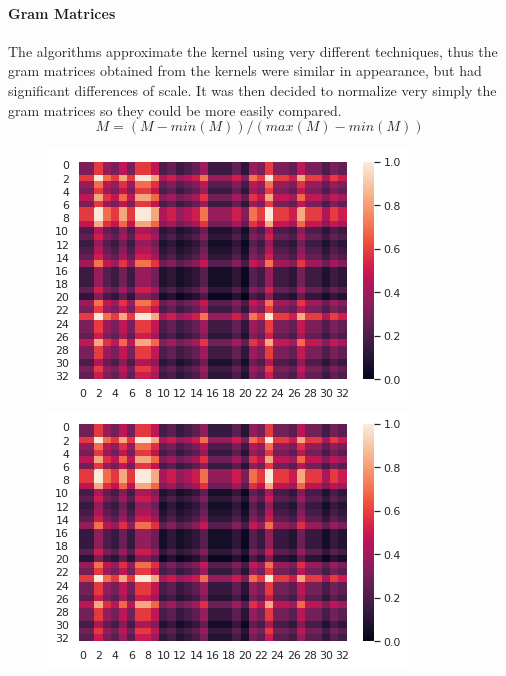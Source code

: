 \documentclass{article}
\theoremstyle{definition}
\begin{document}
\paragraph{Gram Matrices}
The algorithms approximate the kernel using very different techniques, thus the gram matrices obtained from the kernels were similar in appearance, but had significant differences of scale. It was then decided to normalize very simply the gram matrices so they could be more easily compared.
\begin{equation}
M = (M - min(M))/(max(M) - min(M))
\end{equation}
\begin{figure}[!htb]
	\begin{multicols}{3}
		\includegraphics[width=\linewidth]{data/gram/gram3.png}\par
		\includegraphics[width=\linewidth]{data/gram/gram4.png}\par

\end{multicols}
\end{figure}
\end{document}
